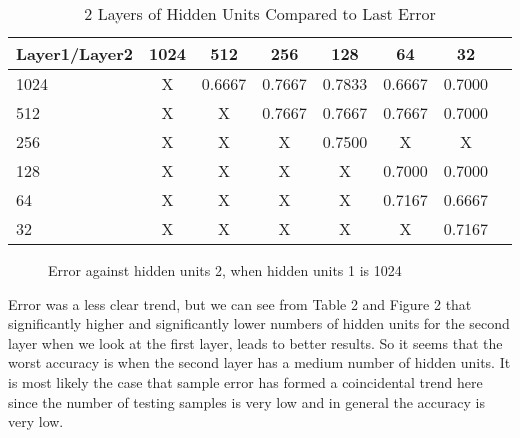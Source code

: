 \documentclass[10pt,a4paper]{article}
\begin{document}
\clearpage

\begin{table}[h]
 \caption{2 Layers of Hidden Units Compared to Last Error}
 \label{tbl:aTable}
 \begin{center}
  \begin{tabular}{lccccccr}
    \hline 
    Layer1/Layer2  & 1024 & 512 & 256 & 128 & 64 & 32  \\
    \hline
	1024 & X & 0.6667 & 0.7667 & 0.7833 & 0.6667 & 0.7000 \\
	512  & X & X      & 0.7667 & 0.7667 & 0.7667 & 0.7000 \\
	256  & X & X      & X      & 0.7500 & X      & X      \\
	128  & X & X      & X      & X      & 0.7000 & 0.7000 \\
	64   & X & X      & X      & X      & 0.7167 & 0.6667 \\
	32   & X & X      & X      & X      & X      & 0.7167 \\
    \hline 
  \end{tabular}
 \end{center}
\end{table}

\begin{figure}[h]
\begin{center}
	\caption{Error against hidden units 2, when hidden units 1 is 1024}
	\end{center}
\end{figure}

	Error was a less clear trend, but we can see from Table 2 and Figure 2 that significantly higher and significantly lower numbers of hidden units for the second layer when we look at the first layer, leads to better results. So it seems that the worst accuracy is when the second layer has a medium number of hidden units. It is most likely the case that sample error has formed a coincidental trend here since the number of testing samples is very low and in general the accuracy is very low.

\clearpage
\end{document}
